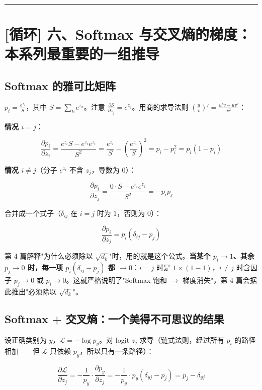 \vspace{0.8em}\hrule\vspace{0.8em}

\section{[循环] 六、Softmax 与交叉熵的梯度：本系列最重要的一组推导}

\subsection{Softmax 的雅可比矩阵}

$p_i = \frac{e^{z_i}}{S}$，其中 $S = \sum_k e^{z_k}$。注意 $\frac{\partial S}{\partial z_j} = e^{z_j}$。用商的求导法则 $\left(\frac{u}{v}\right)' = \frac{u'v - uv'}{v^2}$：

\textbf{情况 $i = j$}：

\[
\frac{\partial p_i}{\partial z_i} = \frac{e^{z_i} S - e^{z_i} e^{z_i}}{S^2} = \frac{e^{z_i}}{S} - \left(\frac{e^{z_i}}{S}\right)^2 = p_i - p_i^2 = p_i(1 - p_i)
\]

\textbf{情况 $i \neq j$}（分子 $e^{z_i}$ 不含 $z_j$，导数为 0）：

\[
\frac{\partial p_i}{\partial z_j} = \frac{0 \cdot S - e^{z_i} e^{z_j}}{S^2} = -p_i p_j
\]

合并成一个式子（$\delta_{ij}$ 在 $i=j$ 时为 1，否则为 0）：

\[
\boxed{\ \frac{\partial p_i}{\partial z_j} = p_i(\delta_{ij} - p_j)\ }
\]

第 4 篇解释"为什么必须除以 $\sqrt{d_k}$"时，用的就是这个公式。\textbf{当某个 $p_i \to 1$、其余 $p_j \to 0$ 时，每一项 $p_i(\delta_{ij} - p_j)$ 都 $\to 0$}：$i=j$ 时是 $1 \times (1-1)$，$i \neq j$ 时含因子 $p_j \to 0$ 或 $p_i \to 0$。这就严格说明了"Softmax 饱和 $\rightarrow$ 梯度消失"，第 4 篇会据此推出"必须除以 $\sqrt{d_k}$"。

\subsection{Softmax + 交叉熵：一个美得不可思议的结果}

设正确类别为 $y$，$\mathcal{L} = -\log p_y$。对 logit $z_j$ 求导（链式法则，经过所有 $p_i$ 的路径相加——但 $\mathcal{L}$ 只依赖 $p_y$，所以只有一条路径）：

\[
\frac{\partial \mathcal{L}}{\partial z_j} = -\frac{1}{p_y} \cdot \frac{\partial p_y}{\partial z_j} = -\frac{1}{p_y} \cdot p_y(\delta_{yj} - p_j) = p_j - \delta_{yj}
\]

